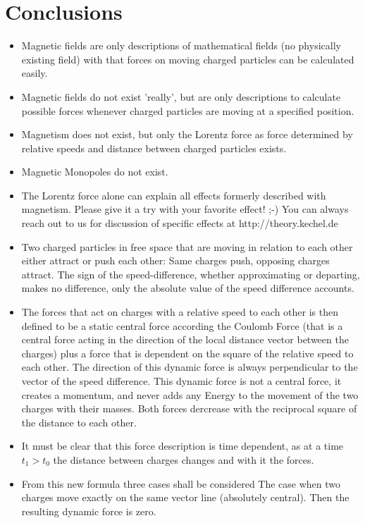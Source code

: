\documentclass[12pt,a4paper,twocolumn]{article}
\begin{document}
\section{Conclusions}
\begin{itemize}
  \item Magnetic fields are only descriptions of mathematical fields (no physically existing field) with that forces on moving charged particles can be calculated easily.
  \item Magnetic fields do not exist 'really', but are only descriptions to calculate possible forces whenever charged particles are moving at a specified position.
  \item Magnetism does not exist, but only the Lorentz force as force determined by relative speeds and distance between charged particles exists.
  \item Magnetic Monopoles do not exist.
  \item The Lorentz force alone can explain all effects formerly described with magnetism. Please give it a try with your favorite effect! ;-) You can always reach out to us for discussion of specific effects at http://theory.kechel.de
  \item Two charged particles in free space that are moving in relation to each other either attract or push each other: Same charges push, opposing charges attract. The sign of the speed-difference, whether approximating or departing, makes no difference, only the absolute value of the speed difference accounts.
  \item The forces that act on charges with a relative speed to each other is then defined to be a static central force according the Coulomb Force (that is a central force acting in the direction of the local distance vector between the charges) plus a force that is dependent on the square of the relative speed to each other. The direction of this dynamic force is always perpendicular to the vector of the speed difference. This dynamic force is not a central force, it creates a momentum, and never adds any Energy to the movement of the two charges with their masses. Both forces dercrease with the reciprocal square of the distance to each other.
  \item It must be clear that this force description is time dependent, as at a time $t_1>t_0$ the distance between charges changes and with it the forces.
  \item From this new formula three cases shall be considered
  \subitem The case when two charges move exactly on the same vector line (absolutely central). Then the resulting dynamic force is zero.

\end{itemize}
\end{document}
